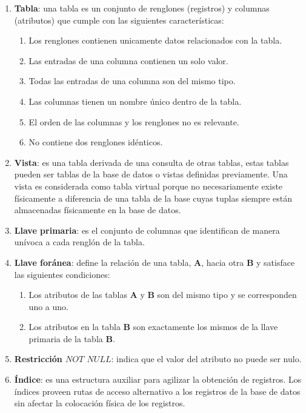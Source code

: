 \begin{enumerate}
	\item \textbf{Tabla}: una tabla es un conjunto de renglones (registros) y columnas (atributos) que cumple con las siguientes características\cite{DataBaseConcepts}:
	\begin{enumerate}
		\item Los renglones contienen unicamente datos relacionados con la tabla.
		\item Las entradas de una columna contienen un solo valor.
		\item Todas las entradas de una columna son del mismo tipo.
		\item Las columnas tienen un nombre único dentro de la tabla.
		\item El orden de las columnas y los renglones no es relevante.
		\item No contiene dos renglones idénticos.
	\end{enumerate}
	\item \textbf{Vista}: es una tabla derivada de una consulta de otras tablas, estas tablas pueden ser tablas de la base de datos o vistas definidas previamente. Una vista es considerada como tabla virtual porque no necesariamente existe físicamente a diferencia de una tabla de la base cuyas tuplas siempre están almacenadas físicamente en la base de datos\cite{FundamentalsOfDBSystems}.
	\item \textbf{Llave primaria}: es el conjunto de columnas que identifican de manera unívoca a cada renglón de la tabla.\cite{DataBaseConcepts}
	\item \textbf{Llave foránea}: define la relación de una tabla, \textbf{A}, hacia otra \textbf{B} y satisface las siguientes condiciones\cite{FundamentalsOfDBSystems, DataBaseConcepts}:
	\begin{enumerate}
		\item Los atributos de las tablas \textbf{A} y \textbf{B} son del mismo tipo y se corresponden uno a uno.
		\item Los atributos en la tabla \textbf{B} son exactamente los mismos de la llave primaria de la tabla \textbf{B}.
	\end{enumerate}
	\item \textbf{Restricción $NOT$ $NULL$}: indica que el valor del atributo no puede ser nulo\cite{FundamentosSistemasBasesDatos}. 
	\item \textbf{Índice}: es una estructura auxiliar para agilizar la obtención de registros. Los índices proveen rutas de acceso alternativo a los registros de la base de datos sin afectar la colocación física de los registros\cite{FundamentalsOfDBSystems}.

\end{enumerate}
